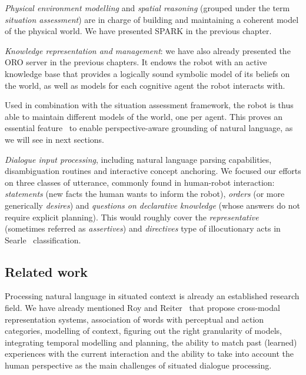\begin{inparaenum}[\itshape 1)]

\item \emph{Physical environment modelling} and \emph{spatial reasoning}
(grouped under the term \emph{situation assessment})  are in charge of building
and maintaining a coherent model of the physical world. We have presented SPARK
in the previous chapter.

\item \emph{Knowledge representation and management}: we have also already
presented the ORO server in the previous chapters. It endows the robot with an
active knowledge base that provides a logically sound symbolic model of its
beliefs on the world, as well as models for each cognitive agent the robot
interacts with.

Used in combination with the situation assessment framework, the robot is thus
able to maintain different models of the world, one per agent. This proves an
essential feature~\cite{Roy2005, Kruijff2010} to enable perspective-aware
grounding of natural language, as we will see in next sections.

\item \emph{Dialogue input processing}, including natural language parsing
capabilities, disambiguation routines and interactive concept anchoring. We
focused our efforts on three classes of utterance, commonly found in
human-robot interaction: \emph{statements} (\ie new facts the human wants to
inform the robot), \emph{orders} (or more generically \emph{desires}) and
\emph{questions on declarative knowledge} (whose answers do not require
explicit planning). This would roughly cover the \emph{representative}
(sometimes referred as \emph{assertives}) and \emph{directives} type of
illocutionary acts in Searle~\cite{Searle1976} classification.

\end{inparaenum}

\subsection{Related work}
\label{sect|dialogs-related-work}

Processing natural language in situated context is already an established
research field. We have already mentioned Roy and Reiter~\cite{Roy2005} that
propose cross-modal representation systems, association of words with
perceptual and action categories, modelling of context, figuring out the right
granularity of models, integrating temporal modelling and planning, the ability
to match past (learned) experiences with the current interaction and the
ability to take into account the human perspective as the main challenges of
situated dialogue processing.

